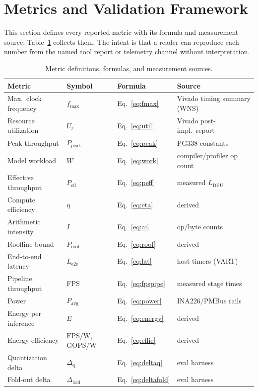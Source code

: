 \documentclass[onecolumn,journal]{IEEEtran}
\newcommand{\fmax}{f_{\mathrm{max}}}
\newcommand{\Ppeak}{P_{\mathrm{peak}}}
\begin{document}
\section{Metrics and Validation Framework}\label{sec:metrics}
This section defines every reported metric with its formula and measurement source;
Table~\ref{tab:metricdefs} collects them. The intent is that a reader can reproduce
each number from the named tool report or telemetry channel without interpretation.

\begin{table}[t]
\centering
\caption{Metric definitions, formulas, and measurement sources.}
\label{tab:metricdefs}
\setlength{\tabcolsep}{4pt}
\renewcommand{\arraystretch}{1.35}
\begin{tabular}{llll}
\toprule
Metric & Symbol & Formula & Source\\
\midrule
Max.\ clock frequency & $\fmax$ & Eq.~\eqref{eq:fmax} & Vivado timing summary (WNS)\\
Resource utilization & $U_r$ & Eq.~\eqref{eq:util} & Vivado post-impl.\ report\\
Peak throughput & $\Ppeak$ & Eq.~\eqref{eq:peak} & PG338 constants \cite{amd_pg338}\\
Model workload & $W$ & Eq.~\eqref{eq:work} & compiler/profiler op count\\
Effective throughput & $P_{\mathrm{eff}}$ & Eq.~\eqref{eq:peff} & measured $L_{\mathrm{DPU}}$\\
Compute efficiency & $\eta$ & Eq.~\eqref{eq:eta} & derived\\
Arithmetic intensity & $I$ & Eq.~\eqref{eq:ai} & op/byte counts\\
Roofline bound & $P_{\mathrm{roof}}$ & Eq.~\eqref{eq:roof} & derived\\
End-to-end latency & $L_{\mathrm{e2e}}$ & Eq.~\eqref{eq:lat} & host timers (VART)\\
Pipeline throughput & FPS & Eq.~\eqref{eq:fpspipe} & measured stage times\\
Power & $P_{\mathrm{avg}}$ & Eq.~\eqref{eq:power} & INA226/PMBus rails\\
Energy per inference & $E$ & Eq.~\eqref{eq:energy} & derived\\
Energy efficiency & $\mathrm{FPS/W}$, GOPS/W & Eq.~\eqref{eq:effic} & derived\\
Quantization delta & $\Delta_{\mathrm{q}}$ & Eq.~\eqref{eq:deltaq} & eval harness\\
Fold-out delta & $\Delta_{\mathrm{fold}}$ & Eq.~\eqref{eq:deltafold} & eval harness\\
\bottomrule
\end{tabular}
\end{table}
\end{document}
